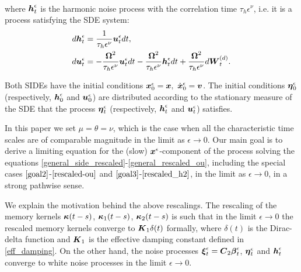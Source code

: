 \begin{itemize}
\begin{align}
\end{align} 
where  $\boldsymbol{h}^\epsilon_{t}$ is the harmonic noise process with the correlation time $\tau_{h} \epsilon^{\nu}$, i.e. it is a  process satisfying the SDE system:
\begin{align} 
d\boldsymbol{h}^\epsilon_{t} &= \frac{1}{\tau_{h}\epsilon^{\nu}} \boldsymbol{u}^\epsilon_{t} dt, \label{rescaled_h1} \\ 
d\boldsymbol{u}^\epsilon_{t} &= -\frac{\boldsymbol{\Omega}^2}{\tau_{h} \epsilon^{\nu}} \boldsymbol{u}^\epsilon_{t} dt - \frac{\boldsymbol{\Omega}^2}{\tau_{h} \epsilon^{\nu}} \boldsymbol{h}^\epsilon_{t} dt + \frac{\boldsymbol{\Omega}^2}{\tau_{h} \epsilon^{\nu}} d\boldsymbol{W}^{(d)}_{t}. \label{rescaled_h2}
\end{align}

Both SIDEs have the initial conditions $\boldsymbol{x}^\epsilon_{0} = \boldsymbol{x}, \  \dot{\boldsymbol{x}}^\epsilon_{0} = \boldsymbol{v}$. The initial conditions $\boldsymbol{\eta}^\epsilon_{0}$ (respectively, $\boldsymbol{h}^\epsilon_{0}$ and $\boldsymbol{u}^\epsilon_{0}$) are distributed according to the stationary measure of the SDE that the process $\boldsymbol{\eta}^\epsilon_{t}$ (respectively, $\boldsymbol{h}^\epsilon_{t}$ and $\boldsymbol{u}^\epsilon_{t}$) satisfies.
\end{itemize}


In this paper we set $\mu = \theta = \nu$, which is the case when all the characteristic time scales are of comparable magnitude in the limit as $\epsilon \to 0$.  Our main goal is to derive a limiting equation for the (slow) $\boldsymbol{x}^\epsilon$-component of the process solving the equations \eqref{general_side_rescaled}-\eqref{general_rescaled_ou}, including the special cases  $\eqref{goal2}$-$\eqref{rescaled-ou}$ and $\eqref{goal3}$-$\eqref{rescaled_h2}$, in the limit as  $\epsilon \to 0$, in a strong pathwise sense.

We explain the motivation behind the above rescalings. The rescaling of the memory kernels $\boldsymbol{\kappa}(t-s)$, $\boldsymbol{\kappa}_{1}(t-s)$, $\boldsymbol{\kappa}_{2}(t-s)$ is such that in the limit $\epsilon \to 0$ the rescaled memory kernels converge to $\boldsymbol{K}_1 \delta(t) $  formally, where $\delta(t)$ is the Dirac-delta function and $\boldsymbol{K}_1$ is the effective damping constant defined in \eqref{eff_damping}. On the other hand, the noise processes $\boldsymbol{\xi}^\epsilon_t = \boldsymbol{C}_2 \boldsymbol{\beta}^\epsilon_{t}$, $\boldsymbol{\eta}^\epsilon_{t}$ and $\boldsymbol{h}^\epsilon_{t}$ converge to  white noise processes in the limit $\epsilon \to 0$. 



